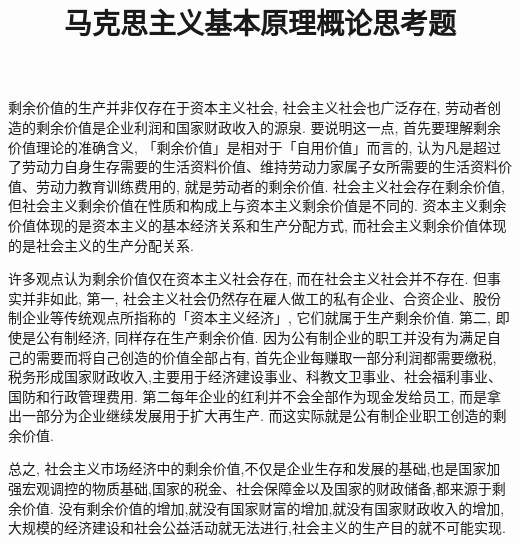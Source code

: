 \documentclass[UTF8,9pt]{ctexart}
\title{马克思主义基本原理概论思考题}
\begin{document}
 
\maketitle
{}
剩余价值的生产并非仅存在于资本主义社会, 社会主义社会也广泛存在, 劳动者创造的剩余价值是企业利润和国家财政收入的源泉. 要说明这一点, 首先要理解剩余价值理论的准确含义, 「剩余价值」是相对于「自用价值」而言的, 认为凡是超过了劳动力自身生存需要的生活资料价值、维持劳动力家属子女所需要的生活资料价值、劳动力教育训练费用的, 就是劳动者的剩余价值. 社会主义社会存在剩余价值, 但社会主义剩余价值在性质和构成上与资本主义剩余价值是不同的. 资本主义剩余价值体现的是资本主义的基本经济关系和生产分配方式, 而社会主义剩余价值体现的是社会主义的生产分配关系. 

许多观点认为剩余价值仅在资本主义社会存在, 而在社会主义社会并不存在. 但事实并非如此, 第一, 社会主义社会仍然存在雇人做工的私有企业、合资企业、股份制企业等传统观点所指称的「资本主义经济」, 它们就属于生产剩余价值. 第二, 即使是公有制经济, 同样存在生产剩余价值. 因为公有制企业的职工并没有为满足自己的需要而将自己创造的价值全部占有, 首先企业每赚取一部分利润都需要缴税, 税务形成国家财政收入,主要用于经济建设事业、科教文卫事业、社会福利事业、国防和行政管理费用. 第二每年企业的红利并不会全部作为现金发给员工, 而是拿出一部分为企业继续发展用于扩大再生产. 而这实际就是公有制企业职工创造的剩余价值. 

总之, 社会主义市场经济中的剩余价值,不仅是企业生存和发展的基础,也是国家加强宏观调控的物质基础,国家的税金、社会保障金以及国家的财政储备,都来源于剩余价值. 没有剩余价值的增加,就没有国家财富的增加,就没有国家财政收入的增加,大规模的经济建设和社会公益活动就无法进行,社会主义的生产目的就不可能实现. 
\end{document}
